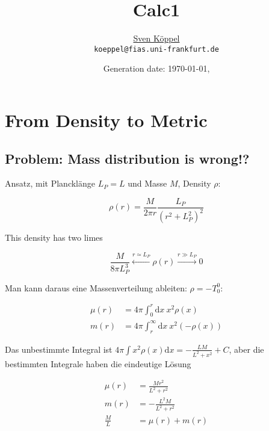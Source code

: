 \documentclass[12pt,a4paper]{article}
\title{\vspace{-9ex} Calc1 \vspace{-1ex}} %
\author{\small %
\href{https://itp.uni-frankfurt.de/~koeppel}{Sven Köppel} \\
\small \texttt{koeppel@fias.uni-frankfurt.de}}
\date{\small Generation date: \today, \currenttime}
\begin{document}
\maketitle

\renewcommand{\L}{L_P}
\newcommand{\pr}{p_r}
\newcommand{\psenk}{p_\perp}
\renewcommand{\d}{\mathrm{d}}
\newcommand{\ebenso}{\biggl( ~ \therefore ~ \biggr) }
\newcommand{\metrik}[1]{\d s^2 = \left( #1 \right) \d t^2 \left( #1 \right)^{-1} \d r^2 + r^2 \d \Omega^2 }
\newcommand{\winkel}{r^2 \d \Omega^2}
\newcommand{\dann}{$\rightarrow~$}

\section{From Density to Metric}
\subsection{Problem: Mass distribution is wrong!?}

Ansatz, mit Plancklänge $\L=L$ und Masse $M$, Density $\rho$:

\begin{equation}
\rho(r) = \frac{M}{2\pi r} \frac{\L}{(r^2 + \L^2)^2}
\end{equation}

This density has two limes

\begin{equation}
\frac{M}{8\pi \L^3} \xleftarrow{r \simeq \L} \rho(r) \xrightarrow {r \gg \L} 0
\end{equation}

Man kann daraus eine Massenverteilung ableiten: $\rho = -T^0_0$:

\begin{align}
\mu(r) &= 4 \pi \int_0^r \mathrm{d} x ~ x^2  \rho(x) \\
m(r) &= 4 \pi \int_r^\infty \mathrm{d}x ~x^2 (- \rho(x))
\end{align}

Das unbestimmte Integral ist $4\pi \int x^2 \rho(x) \mathrm{d}x = - \frac{LM}{L^2 + x^2} + C$, aber die bestimmten Integrale haben die eindeutige Lösung

\begin{align}
\mu(r) &= \frac{M r^2}{L^2+r^2} \\
m(r) &= -\frac{L^2 M}{L^2+r^2} \label{svenM} \\
\frac{M}{L} &= \mu(r) + m(r)
\end{align}
\end{document}
